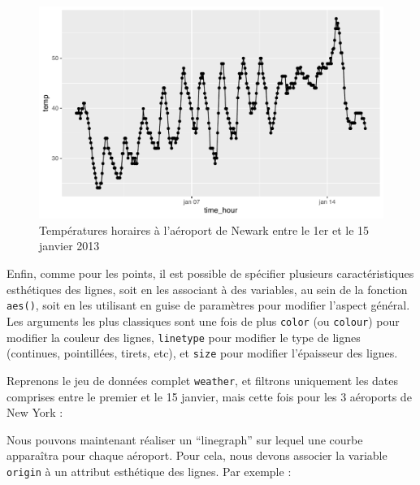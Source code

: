 \documentclass[a4paperpaper,]{article}
\newenvironment{Shaded}{\begin{snugshade}}{\end{snugshade}}
\newcommand{\DecValTok}[1]{\textcolor[rgb]{0.69,0.50,0.00}{#1}}
\newcommand{\KeywordTok}[1]{\textcolor[rgb]{0.12,0.11,0.11}{\textbf{#1}}}
\newcommand{\NormalTok}[1]{\textcolor[rgb]{0.12,0.11,0.11}{#1}}
\newcommand{\OperatorTok}[1]{\textcolor[rgb]{0.12,0.11,0.11}{#1}}
\newcommand{\StringTok}[1]{\textcolor[rgb]{0.75,0.01,0.01}{#1}}
\theoremstyle{definition}
\theoremstyle{definition}
\theoremstyle{definition}
\theoremstyle{remark}
\begin{document}
\begin{figure}[htpb]

{\centering \includegraphics[width=0.9\linewidth]{figure/lineplotgraph-1} 

}

\caption{Températures horaires à l'aéroport de Newark entre le 1er et le 15 janvier 2013}\label{fig:lineplotgraph}
\end{figure}

Enfin, comme pour les points, il est possible de spécifier plusieurs
caractéristiques esthétiques des lignes, soit en les associant à des
variables, au sein de la fonction \texttt{aes()}, soit en les utilisant
en guise de paramètres pour modifier l'aspect général. Les arguments les
plus classiques sont une fois de plus \texttt{color} (ou
\texttt{colour}) pour modifier la couleur des lignes, \texttt{linetype}
pour modifier le type de lignes (continues, pointillées, tirets, etc),
et \texttt{size} pour modifier l'épaisseur des lignes.

Reprenons le jeu de données complet \texttt{weather}, et filtrons
uniquement les dates comprises entre le premier et le 15 janvier, mais
cette fois pour les 3 aéroports de New York :

\begin{Shaded}
\end{Shaded}

Nous pouvons maintenant réaliser un ``linegraph'' sur lequel une courbe
apparaîtra pour chaque aéroport. Pour cela, nous devons associer la
variable \texttt{origin} à un attribut esthétique des lignes. Par
exemple :
\end{document}
